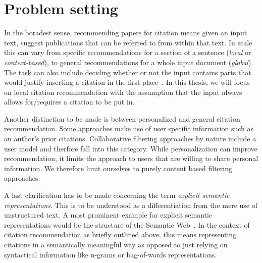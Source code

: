 


\section{Problem setting}\label{sec:problemsetting}
In the boradest sense, recommending papers for citation means given an input text, suggest publications that can be referred to from within that text. In scale this can vary from specific recommendations for a section of a sentence (\emph{local} or \emph{context-based}), to general recommendations for a whole input document (\emph{global}). The task can also include deciding whether or not the input contains parts that would justify inserting a citation in the first place~\cite{He2011}. In this thesis, we will focus on local citation recommendation with the assumption that the input always allows for/requires a citation to be put in.

Another distinction to be made is between personalized and general citation recommendation. Some approaches make use of user specific information such as an author's prior citations. Collaborative filtering approaches by nature include a user model and therfore fall into this category. While personalization can improve recommendation, it limits the approach to users that are willing to share personal information. %
We therefore limit ourselves to purely content based filtering approaches.

A last clarification has to be made concerning the term \emph{explicit semantic representations}. This is to be understood as a differentiation from the mere use of unstructured text. A most prominent example for explicit semantic representations would be the structure of the Semantic Web~\cite{Berners-Lee2001}. In the context of citation recommendation as briefly outlined above, this means representing citations in a semantically meaningful way as opposed to just relying on syntactical information like n-grams or bag-of-words representations.

